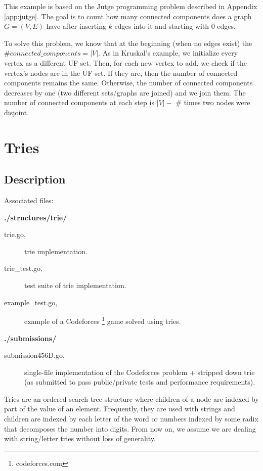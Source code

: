 \documentclass[a4paper,10pt,table,xcdraw]{article}
\begin{document}
This example is based on the Jutge programming problem described in Appendix \ref{app:jutge}. The goal is to count how many connected components does a graph $G = (V, E)$ have after inserting $k$ edges into it and starting with 0 edges.

To solve this problem, we know that at the beginning (when no edges exist) the $\# connected\_components = | V | $. As in Kruskal's example, we initialize every vertex as a different UF set. Then, for each new vertex to add, we check if the vertex's nodes are in the UF set. If they are, then the number of connected components remains the same. Otherwise, the number of connected components decreases by one (two different sets/graphs are joined) and we join them. The number of connected components at each step is $ |V| - $ \# times two nodes were disjoint.



\section{Tries}
\label{sec:tries}

\subsection{Description}

Associated files:

\textbf{./structures/trie/}
\begin{description}
\item [\hspace{10mm} trie.go,] trie implementation.
\item [\hspace{10mm} trie\_test.go,] test suite of trie implementation.
\item [\hspace{10mm} example\_test.go,] example of a Codeforces \footnote{codeforces.com} game solved using tries.
\end{description}
\textbf{./submissions/}
\begin{description}
\item [\hspace{10mm} submission456D.go,] single-file implementation of the Codeforces problem + stripped down trie (as submitted to pass public/private tests and performance requirements). 
\end{description}


Tries are an ordered search tree structure where children of a node are indexed by part of the value of an element. Frequently, they are used with strings and children are indexed by each letter of the word or numbers indexed by some radix that decomposes the number into digits. From now on, we assume we are dealing with string/letter tries without loss of generality. 
\end{document}
